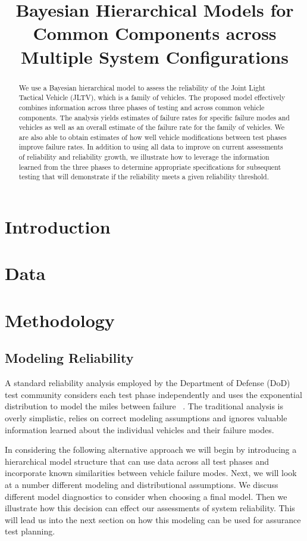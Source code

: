 \documentclass[12pt]{article}
\begin{document}
\title{Bayesian Hierarchical Models for Common Components across Multiple System Configurations}

\begin{abstract}
    We use a Bayesian hierarchical model to assess the reliability of the Joint Light Tactical
    Vehicle (JLTV), which is a family of vehicles. The proposed model effectively combines information
    across three phases of testing and across common vehicle components. The analysis yields
    estimates of failure rates for specific failure modes and vehicles as well as an overall estimate of the
    failure rate for the family of vehicles. We are also able to obtain estimates of how well vehicle
    modifications between test phases improve failure rates. In addition to using all data to improve on
    current assessments of reliability and reliability growth, we illustrate how to leverage the information
    learned from the three phases to determine appropriate specifications for subsequent testing that will
    demonstrate if the reliability meets a given reliability threshold.
\end{abstract}


\section{Introduction}

\section{Data}


\section{Methodology}

\subsection{Modeling Reliability}
A standard reliability analysis employed by the Department of Defense (DoD) test
community considers each test phase independently and uses the exponential
distribution to model the miles between failure ~\cite{ref1}. The traditional
analysis is overly simplistic, relies on correct modeling assumptions
and ignores valuable information learned about the individual vehicles and their
failure modes.

In considering the following alternative approach we will begin by introducing a
hierarchical model structure that can use data across all test phases and
incorporate known similarities between vehicle failure modes.  Next, we will
look at a number different modeling and distributional assumptions.  We discuss
different model diagnostics to consider when choosing a final model.  Then we
illustrate how this decision can effect our assessments of system reliability.
This will lead us into the next section on how this modeling can be used for
assurance test planning.
\end{document}
